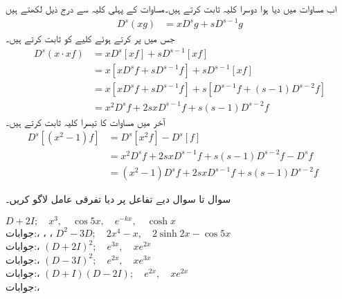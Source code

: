 اب مساوات  میں دیا ہوا دوسرا کلیہ ثابت کرتے ہیں۔مساوات  کے پہلی کلیہ سے درج ذیل لکھتے ہیں
\begin{align*}
D^s(xg)&=xD^sg+sD^{s-1}g
\end{align*} 
 جس میں  پر کرتے ہوئے کلیے کو ثابت کرتے ہیں۔
\begin{align*}
D^s(x\cdot xf)&=xD^s[xf]+sD^{s-1}[xf]\\
&=x[xD^s f +sD^{s-1}f]+sD^{s-1}[xf]\\
&=x[xD^s f +sD^{s-1}f]+s[D^{s-1}f+(s-1)D^{s-2}f]\\
&=x^2D^s f+2sxD^{s-1}f+s(s-1)D^{s-2}f
\end{align*} 
آخر میں مساوات  کا تیسرا کلیہ ثابت کرتے ہیں۔
\begin{align*}
D^s[(x^2-1)f]&=D^s[x^2f]-D^s[f]\\
&=x^2D^sf+2sxD^{s-1}f+s(s-1)D^{s-2}f-D^sf\quad \quad \\
&=(x^2-1)D^sf+2sxD^{s-1}f+s(s-1)D^{s-2}f
\end{align*}



سوال  تا سوال  دیے تفاعل پر دیا تفرقی عامل لاگو کریں۔
  
$D+2I; \quad x^3, \quad \cos 5x, \quad e^{-kx}, \quad \cosh x$\\
جوابات:، ، ، 
$D^2-3D; \quad 2x^4-x, \quad 2\sinh 2x-\cos 5x$\\
جوابات:، 
$(D+2I)^2; \quad e^{3x}, \quad xe^{2x}$\\
جوابات:، 
$(D-3I)^2; \quad e^{2x}, \quad xe^{3x}$\\
جوابات:، 
$(D+I)(D-2I); \quad e^{2x}, \quad xe^{2x}$\\
جوابات:، 

